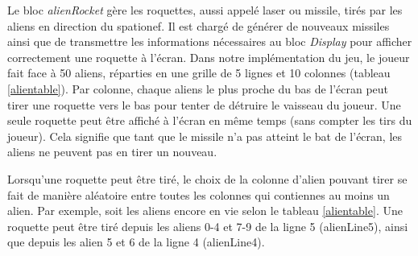 \documentclass[french]{nakrule}
\begin{document}
Le bloc \emph{alienRocket} gère les roquettes, aussi appelé laser ou missile, tirés par
les aliens en direction du spationef. Il est chargé de générer de nouveaux
missiles ainsi que de transmettre les informations nécessaires au bloc \emph{Display} pour afficher
correctement une roquette à l'écran.
Dans notre implémentation du jeu, le joueur fait face à 50 aliens, réparties en
une grille de 5 lignes et 10 colonnes (tableau \ref{alientable}). Par colonne,
chaque aliens le plus proche du bas de l'écran peut tirer une roquette vers le
bas pour tenter de détruire le vaisseau du joueur. Une seule roquette peut être
affiché à l'écran en même temps (sans compter les tirs du joueur). Cela signifie
que tant que le missile n'a pas atteint le bat de l'écran, les aliens ne peuvent
pas en tirer un nouveau.

Lorsqu'une roquette peut être tiré, le choix de la colonne d'alien pouvant tirer
se fait de manière aléatoire entre toutes les colonnes qui contiennes au moins un
alien. Par exemple, soit les aliens encore en vie selon le tableau
\ref{alientable}. Une roquette peut être tiré depuis les aliens 0-4 et 7-9 de la
ligne 5 (alienLine5), ainsi que depuis les alien 5 et 6 de la ligne 4 (alienLine4).
\end{document}

